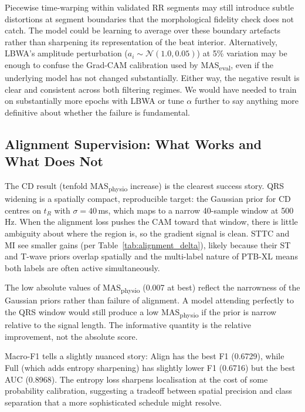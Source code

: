 \documentclass{article}
\begin{document}
Piecewise time-warping within validated RR segments may still
introduce subtle distortions at segment boundaries that the
morphological fidelity check does not catch. The model could be
learning to average over these boundary artefacts rather than
sharpening its representation of the beat interior. Alternatively,
LBWA's amplitude perturbation ($a_i \sim \mathcal{N}(1.0, 0.05)$)
at 5\% variation may be enough to confuse the Grad-CAM calibration
used by MAS\textsubscript{eval}, even if the underlying model has
not changed substantially. Either way, the negative result is clear
and consistent across both filtering regimes. We would have needed
to train on substantially more epochs with LBWA or tune $\alpha$
further to say anything more definitive about whether the failure
is fundamental.

\subsection{Alignment Supervision: What Works and What Does Not}

The CD result (tenfold MAS\textsubscript{physio} increase) is the
clearest success story. QRS widening is a spatially compact,
reproducible target: the Gaussian prior for CD centres on $t_R$ with
$\sigma = 40$\,ms, which maps to a narrow 40-sample window at 500\,Hz.
When the alignment loss pushes the CAM toward that window, there is
little ambiguity about where the region is, so the gradient signal is
clean. STTC and MI see smaller gains (per Table~\ref{tab:alignment_delta}),
likely because their ST and T-wave priors overlap spatially and the
multi-label nature of PTB-XL means both labels are often active
simultaneously.

The low absolute values of MAS\textsubscript{physio} (0.007 at best)
reflect the narrowness of the Gaussian priors rather than failure of
alignment. A model attending perfectly to the QRS window would still
produce a low MAS\textsubscript{physio} if the prior is narrow relative
to the signal length. The informative quantity is the relative
improvement, not the absolute score.

Macro-F1 tells a slightly nuanced story: Align has the best F1
(0.6729), while Full (which adds entropy sharpening) has slightly
lower F1 (0.6716) but the best AUC (0.8968). The entropy loss
sharpens localisation at the cost of some probability calibration,
suggesting a tradeoff between spatial precision and class separation
that a more sophisticated schedule might resolve.
\end{document}
